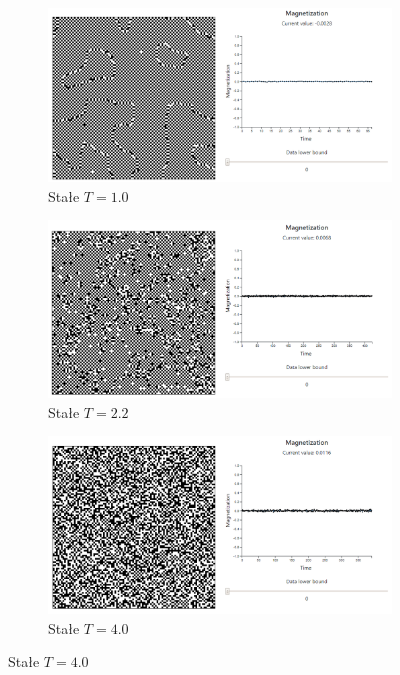 \documentclass[11pt] {article}
\begin{document}
\begin{figure}[H]
\begin{subfigure}{.5\textwidth}
  \centering
  \includegraphics[width=0.9\linewidth]{res/T_1_negative.png}
  \caption{Stałe $T = 1.0$}
  \label{fig:TJN1}
\end{subfigure}
\begin{subfigure}{.5\textwidth}
  \centering
  \includegraphics[width=0.9\linewidth]{res/T_2_2_negative.png}
  \caption{Stałe $T = 2.2$}
  \label{fig:TJN2}
\end{subfigure}
\begin{subfigure}{.5\textwidth}
  \centering
  \includegraphics[width=0.9\linewidth]{res/T_4_negative.png}
  \caption{Stałe $T = 4.0$}
  \label{fig:TJN4}
\end{subfigure}

\end{figure}
\end{document}
